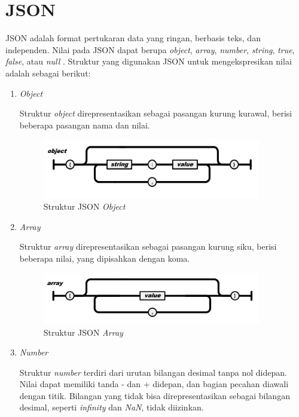 \section{JSON}
\par JSON adalah format pertukaran data yang ringan, berbasis teks, dan independen. Nilai pada JSON dapat berupa \textit{object}, \textit{array}, \textit{number}, \textit{string}, \textit{true}, \textit{false}, atau \textit{null} \cite{json-online}. Struktur yang digunakan JSON untuk mengekspresikan nilai adalah sebagai berikut:
\begin{enumerate}[listparindent=2.5em]
	\item \textit{Object}
	\par Struktur \textit{object} direpresentasikan sebagai pasangan kurung kurawal, berisi beberapa pasangan nama dan nilai.
	\begin{figure}[H]
		\centering\includegraphics[width=0.9\textwidth]{bab2/img/json_object.jpg}
		\caption{Struktur JSON \textit{Object}}
	\end{figure}
	\item \textit{Array}
	\par Struktur \textit{array} direpresentasikan sebagai pasangan kurung siku, berisi beberapa nilai, yang dipisahkan dengan koma.
	\begin{figure}[H]
		\centering\includegraphics[width=0.9\textwidth]{bab2/img/json_array.jpg}
		\caption{Struktur JSON \textit{Array}}
	\end{figure}
	\item \textit{Number}
	\par Struktur \textit{number} terdiri dari urutan bilangan desimal tanpa nol didepan. Nilai dapat memiliki tanda - dan + didepan, dan bagian pecahan diawali dengan titik. Bilangan yang tidak bisa direpresentasikan sebagai bilangan desimal, seperti \textit{infinity} dan \textit{NaN}, tidak diizinkan.

\end{enumerate}
